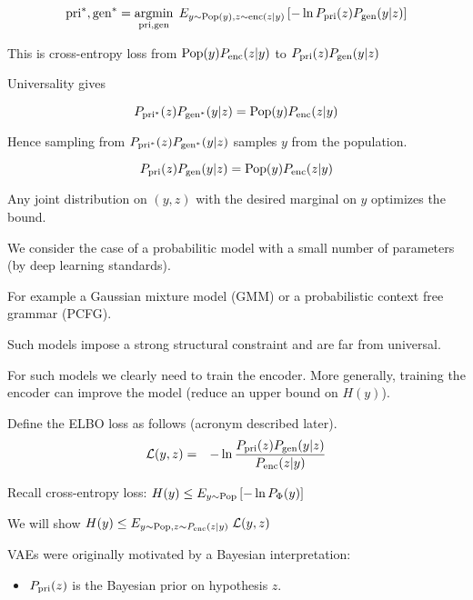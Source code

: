 {
$$\mathrm{pri}^*,\mathrm{gen}^* = \operatorname*{argmin}_{\mathrm{pri},\mathrm{gen}}\;E_{y \sim \mathrm{Pop}(y),z \sim \mathrm{enc}(z|y)}\left[-\ln P_{\mathrm{pri}}(z)P_{\mathrm{gen}}(y|z)\right]$$

\vfill
This is cross-entropy loss from $\mathrm{Pop}(y)P_{\mathrm{enc}}(z|y)$ to $P_{\mathrm{pri}}(z)P_{\mathrm{gen}}(y|z)$

\vfill
Universality gives

{\color{red} $$P_{\mathrm{pri}^*}(z)P_{\mathrm{gen}^*}(y|z) = \mathrm{Pop}(y)P_{\mathrm{enc}}(z|y)$$}

\vfill
Hence sampling from $P_{\mathrm{pri}^*}(z)P_{\mathrm{gen}^*}(y|z)$ samples $y$ from the population.



{\color{red} $$P_{\mathrm{pri}}(z)P_{\mathrm{gen}}(y|z) = \mathrm{Pop}(y)P_{\mathrm{enc}}(z|y)$$}

\vfill
Any joint distribution on $(y,z)$ with the desired marginal on $y$ optimizes the bound.


We consider the case of a probabilitic model with a small number of parameters (by deep learning standards).

\vfill
For example a Gaussian mixture model (GMM) or a probabilistic context free grammar (PCFG).

\vfill
Such models impose a strong structural constraint and are far from universal.

\vfill
For such models we clearly need to train the encoder.  More generally, training the encoder can improve the model
(reduce an upper bound on $H(y)$).



Define the ELBO loss as follows (acronym described later).
\begin{eqnarray*}
{\cal L}(y,z) & = & - \ln \frac{P_{\mathrm{pri}}(z)P_{\mathrm{gen}}(y|z)}{P_{\mathrm{enc}}(z|y)}
\end{eqnarray*}

\vfill
Recall cross-entropy loss: {\color{red} $H(y) \leq E_{y\sim \mathrm{Pop}} \left[ -\ln P_\Phi(y)\right]$}

\vfill
We will show
{\color{red} $H(y) \leq E_{y \sim \mathrm{Pop},z \sim P_{\mathrm{enc}}(z|y)}\;{\cal L}(y,z)$}


VAEs were originally motivated by a Bayesian interpretation:

\vfill
\begin{itemize}
\item $P_{\mathrm{pri}}(z)$ is the Bayesian prior on hypothesis $z$.


\end{itemize}}
